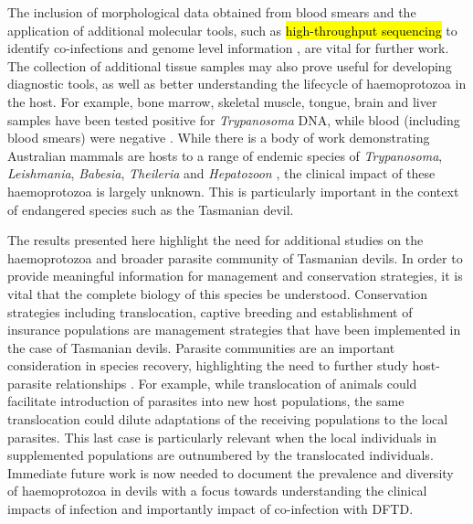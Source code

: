 \documentclass[a4paper, nobind]{templates/ociamthesis}
\begin{document}
The inclusion of morphological data obtained from blood smears and the application of additional molecular tools, such as \hl{high-throughput sequencing} to identify co-infections \autocite{barbosaIncreasedGeneticDiversity2017} and genome level information \autocite{reis-cunhaWholeGenomeSequencing2018}, are vital for further work. The collection of additional tissue samples may also prove useful for developing diagnostic tools, as well as better understanding the lifecycle of haemoprotozoa in the host. For example, bone marrow, skeletal muscle, tongue, brain and liver samples have been tested positive for \emph{Trypanosoma} DNA, while blood (including blood smears) were negative \autocite{northoverDebilitatingDiseasePolyparasitised2018}. While there is a body of work demonstrating Australian mammals are hosts to a range of endemic species of \emph{Trypanosoma}, \emph{Leishmania}, \emph{Babesia}, \emph{Theileria} and \emph{Hepatozoon} \autocite{austenInvestigationMorphologicalDiversity2015,boteroMorphologicalPhylogeneticDescription2016,barbosaSequenceAnalysesMitochondrial2019,northoverIncreasedTrypanosomaSpp2019}, the clinical impact of these haemoprotozoa is largely unknown. This is particularly important in the context of endangered species such as the Tasmanian devil.

The results presented here highlight the need for additional studies on the haemoprotozoa and broader parasite community of Tasmanian devils. In order to provide meaningful information for management and conservation strategies, it is vital that the complete biology of this species be understood. Conservation strategies including translocation, captive breeding and establishment of insurance populations are management strategies that have been implemented in the case of Tasmanian devils. Parasite communities are an important consideration in species recovery, highlighting the need to further study host-parasite relationships \autocite{northoverHiddenConsequencesAltering2018}. For example, while translocation of animals could facilitate introduction of parasites into new host populations, the same translocation could dilute adaptations of the receiving populations to the local parasites. This last case is particularly relevant when the local individuals in supplemented populations are outnumbered by the translocated individuals. Immediate future work is now needed to document the prevalence and diversity of haemoprotozoa in devils with a focus towards understanding the clinical impacts of infection and importantly impact of co-infection with DFTD.
\end{document}
